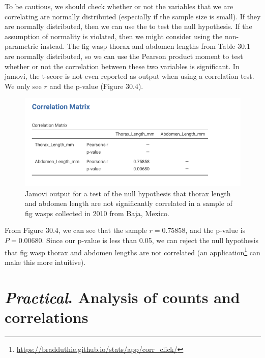 \documentclass[
  openany]{krantz}
\begin{document}
To be cautious, we should check whether or not the variables that we are correlating are normally distributed (especially if the sample size is small).
If they are normally distributed, then we can use the  to test the null hypothesis.
If the assumption of normality is violated, then we might consider using the non-parametric   instead.
The fig wasp thorax and abdomen lengths from Table 30.1 are normally distributed, so we can use the Pearson product moment  to test whether or not the correlation between these two variables is significant.
In jamovi, the t-score is not even reported as output when using a correlation test.
We only see \(r\) and the p-value (Figure 30.4).

\begin{figure}
\includegraphics[width=1\linewidth]{img/Jamovi_correlation_output} \caption{Jamovi output for a test of the null hypothesis that thorax length and abdomen length are not significantly correlated in a sample of fig wasps collected in 2010 from Baja, Mexico.}\label{fig:unnamed-chunk-132}
\end{figure}

From Figure 30.4, we can see that the sample \(r = 0.75858\), and the p-value is \(P = 0.00680\).
Since our p-value is less than 0.05, we can reject the null hypothesis that fig wasp thorax and abdomen lengths are not correlated (an  application\footnote{\url{https://bradduthie.github.io/stats/app/corr_click/}} can make this more intuitive).

\hypertarget{Chapter_31}{%
\chapter{\texorpdfstring{\emph{Practical}. Analysis of counts and correlations}{Practical. Analysis of counts and correlations}}\label{Chapter_31}}
\end{document}
